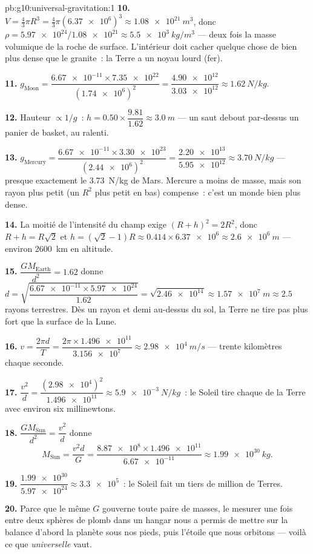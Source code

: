 \begin{solution}{pb:g10:universal-gravitation:1}
\textbf{10.} $V = \frac43 \pi R^3 = \frac43 \pi
(\num{6.37e6})^3 \approx \qty{1.08e21}{m^3}$, donc
$\rho = \num{5.97e24}/\num{1.08e21} \approx \qty{5.5e3}{kg/m^3}$ ---
deux fois la masse volumique de la roche de surface. L'intérieur doit
cacher quelque chose de bien plus dense que le granite~: la Terre a
un noyau lourd (fer).

\textbf{11.} $g_{\text{Moon}} = \dfrac{\num{6.67e-11} \times
\num{7.35e22}}{(\num{1.74e6})^2} = \dfrac{\num{4.90e12}}
{\num{3.03e12}} \approx \qty{1.62}{N/kg}$.

\textbf{12.} Hauteur $\propto 1/g$~:
$h = 0.50 \times \dfrac{9.81}{1.62} \approx \qty{3.0}{m}$ --- un saut
debout par-dessus un panier de basket, au ralenti.

\textbf{13.} $g_{\text{Mercury}} = \dfrac{\num{6.67e-11} \times
\num{3.30e23}}{(\num{2.44e6})^2} = \dfrac{\num{2.20e13}}
{\num{5.95e12}} \approx \qty{3.70}{N/kg}$ --- presque exactement le
\qty{3.73}{N/kg} de Mars. Mercure a moins de masse, mais son rayon
plus petit (un $R^2$ plus petit en bas) compense~: c'est un monde bien
plus dense.

\textbf{14.} La moitié de l'intensité du champ exige
$(R + h)^2 = 2 R^2$, donc $R + h = R\sqrt{2}$ et
$h = (\sqrt{2} - 1) R \approx 0.414 \times \num{6.37e6}
\approx \qty{2.6e6}{m}$ --- environ \qty{2600}{km} en altitude.

\textbf{15.} $\dfrac{G M_{\text{Earth}}}{d^2} = 1.62$ donne
$d = \sqrt{\dfrac{\num{6.67e-11} \times \num{5.97e24}}{1.62}}
= \sqrt{\num{2.46e14}} \approx \qty{1.57e7}{m} \approx 2.5$ rayons
terrestres. Dès un rayon et demi au-dessus du sol, la Terre ne tire
pas plus fort que la surface de la Lune.

\textbf{16.} $v = \dfrac{2\pi d}{T}
= \dfrac{2\pi \times \num{1.496e11}}{\num{3.156e7}}
\approx \qty{2.98e4}{m/s}$ --- trente kilomètres chaque seconde.

\textbf{17.} $\dfrac{v^2}{d} = \dfrac{(\num{2.98e4})^2}{\num{1.496e11}}
\approx \qty{5.9e-3}{N/kg}$~: le Soleil tire chaque
 de la Terre avec environ six millinewtons.

\textbf{18.} $\dfrac{G M_{\text{Sun}}}{d^2} = \dfrac{v^2}{d}$ donne
\[
M_{\text{Sun}} = \frac{v^2 d}{G}
= \frac{\num{8.87e8} \times \num{1.496e11}}{\num{6.67e-11}}
\approx \qty{1.99e30}{kg}.
\]

\textbf{19.} $\dfrac{\num{1.99e30}}{\num{5.97e24}} \approx
\num{3.3e5}$~: le Soleil fait un tiers de million de Terres.

\textbf{20.} Parce que le même $G$ gouverne toute paire de masses, le
mesurer une fois entre deux sphères de plomb dans un hangar nous a
permis de mettre sur la balance d'abord la planète sous nos pieds,
puis l'étoile que nous orbitons --- voilà ce que
\emph{universelle} vaut.
\end{solution}
